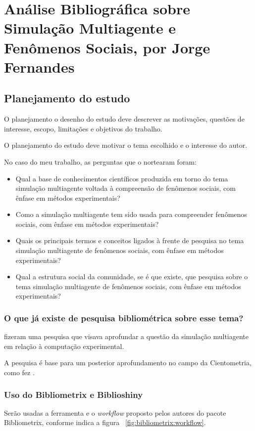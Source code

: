 \chapter{Análise Bibliográfica sobre Simulação Multiagente e Fenômenos Sociais, por Jorge Fernandes\label{chap:bibliometria:jhcf}}

\section{Planejamento do estudo}
O planejamento o  desenho do estudo deve descrever as motivações, questões de interesse, escopo, limitações e objetivos do trabalho.

O planejamento do estudo deve motivar o tema escolhido e o interesse do autor.

No caso do meu trabalho, as perguntas que o nortearam foram:
\begin{itemize}
    \item Qual a base de conhecimentos científicos produzida em torno do tema simulação multiagente voltada à compreensão de fenômenos sociais, com ênfase em métodos experimentais? 
    \item Como a simulação multiagente tem sido usada para compreender fenômenos sociais, com ênfase em métodos experimentais? 
    \item Quais os principais termos e conceitos ligados à frente de pesquisa no tema simulação multiagente de fenômenos sociais, com ênfase em métodos experimentais? 
    \item Qual a estrutura social da comunidade, se é que existe, que pesquisa sobre o tema simulação multiagente de fenômenos sociais, com ênfase em métodos experimentais?
\end{itemize}

\subsection{O que já existe de pesquisa bibliométrica sobre esse tema?}

\cite{gore_classifying_2016} fizeram uma pesquisa que visava aprofundar a questão da simulação multiagente em relação à computação experimental.

A pesquisa é base para um posterior aprofundamento no campo da Cientometria, como fez \cite{chavalarias_whats_2017}.

\subsection{Uso do Bibliometrix e Biblioshiny}
Serão usadas a ferramenta e o \textit{workflow} proposto pelos autores do pacote Bibliometrix, conforme indica a figura ~\ref{fig:bibliometrix:workflow}.

